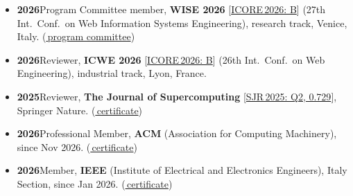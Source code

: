 \documentclass[10pt,a4paper,ragged2e,academicons]{altacv}
\newif\ifshortcv
\newcommand{\Licore}[2]{[\href{https://portal.core.edu.au/conf-ranks/#1/}{ICORE\,2026: #2}]}
\newcommand{\Lsjr}[3]{[\href{https://www.scimagojr.com/journalsearch.php?q=#1&tip=sid}{SJR\,2025: #2, #3}]}
\begin{document}
\begin{paracol}{1} %

\medskip



\begin{itemize}[leftmargin=1.3em, itemsep=2pt, topsep=1pt, parsep=0pt]
  \item \textbf{2026}\enspace Program Committee member, \textbf{WISE 2026} \Licore{1271}{B} (27th Int.~Conf.~on Web Information Systems Engineering), research track, Venice, Italy. {\footnotesize(\href{https://conferences.sigappfr.org/wise2026/program-committee/#letter-F}{\faUsers\,program committee})}
  \item \textbf{2026}\enspace Reviewer, \textbf{ICWE 2026} \Licore{1269}{B} (26th Int.~Conf.~on Web Engineering), industrial track, Lyon, France.
  \item \textbf{2025}\enspace Reviewer, \textbf{The Journal of Supercomputing} \Lsjr{25623}{Q2}{0.729}, Springer Nature. {\footnotesize(\href{https://www.francescotosoni.it/static/peer_review/Reviewer%20Certificate%2009%20December%202025.pdf}{\faCertificate\,certificate})}
\end{itemize}


\begin{itemize}[leftmargin=1.3em, itemsep=2pt, topsep=1pt, parsep=0pt]
  \item \textbf{2026}\enspace Professional Member, \textbf{ACM} (Association for Computing Machinery), since Nov 2026. {\footnotesize(\href{https://www.francescotosoni.it/static/memberships/ACM_2026_certificate.pdf}{\faCertificate\,certificate})}
  \item \textbf{2026}\enspace Member, \textbf{IEEE} (Institute of Electrical and Electronics Engineers), Italy Section, since Jan 2026. {\footnotesize(\href{https://www.francescotosoni.it/static/memberships/IEEE_2026_certificate.pdf}{\faCertificate\,certificate})}
\end{itemize}

\medskip

\ifshortcv\else
{}



\end{paracol}
\end{document}
